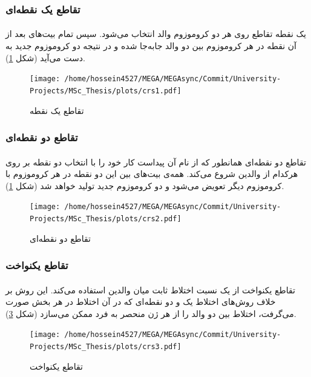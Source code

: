 \documentclass[a4paper,titlepage,12pt,fleqn,oneside]{report}
\begin{document}
	\subsubsection{تقاطع یک نقطه‌ای}
	\paragraph{}
	یک نقطه تقاطع روی هر دو کروموزوم والد انتخاب می‌شود. سپس تمام بیت‌های بعد از آن نقطه در هر کروموزوم بین دو والد جا‌به‌جا شده و در نتیجه دو کروموزوم جدید به دست می‌آید (شکل \ref{fig:crs1}).
	\begin{figure}[h]
		\centering
		\texttt{[image: /home/hossein4527/MEGA/MEGAsync/Commit/University-Projects/MSc\_Thesis/plots/crs1.pdf]}
		\caption{تقاطع یک نقطه}
		\label{fig:crs1}
	\end{figure}
	\subsubsection{تقاطع دو نقطه‌ای}
	\paragraph{}
	تقاطع دو نقطه‌ای همانطور که از نام آن پیداست کار خود را با انتخاب دو نقطه بر روی هرکدام از والدین شروع می‌کند. همه‌ی بیت‌های بین این دو نقطه در هر کروموزوم با کروموزوم دیگر تعویض می‌شود و دو کروموزوم جدید تولید خواهد شد (شکل \ref{fig:crs1}).
	\begin{figure}[h]
		\centering
		\texttt{[image: /home/hossein4527/MEGA/MEGAsync/Commit/University-Projects/MSc\_Thesis/plots/crs2.pdf]}
		\caption{تقاطع دو نقطه‌ای}
		\label{fig:crs2}
	\end{figure}
	\subsubsection{تقاطع یکنواخت}
	\paragraph{}
	تقاطع یکنواخت از یک نسبت اختلاط ثابت میان والدین استفاده می‌کند. این روش بر خلاف روش‌های اختلاط یک و دو نقطه‌ای که در آن اختلاط در هر بخش صورت می‌گرفت، اختلاط بین دو والد را از هر ژن منحصر به فرد ممکن می‌سازد (شکل \ref{fig:crs3}).
	\begin{figure}[h]
		\centering
		\texttt{[image: /home/hossein4527/MEGA/MEGAsync/Commit/University-Projects/MSc\_Thesis/plots/crs3.pdf]}
		\caption{تقاطع یکنواخت}
		\label{fig:crs3}
	\end{figure}
\end{document}
